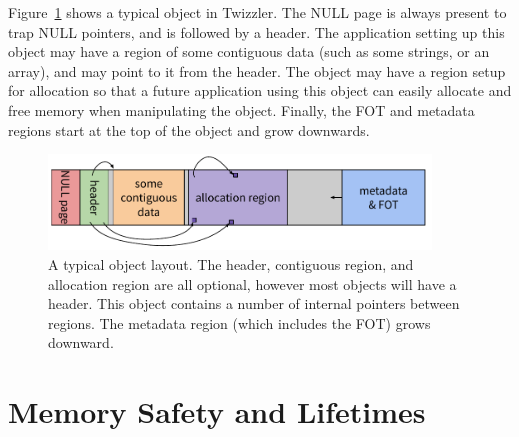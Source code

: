 {    Figure~\ref{fig:typobj} shows a typical object in Twizzler. The NULL page is always present to trap
    NULL pointers, and is followed by a header. The application setting up this object may have a region
    of some contiguous data (such as some strings, or an array), and may point to it from the header.
    The object may have a region setup for allocation so that a future application using this
    object can easily allocate and free memory when manipulating the object. Finally, the FOT and
    metadata regions start at the top of the object and grow downwards.
    \begin{figure}
        \centering
        \includegraphics[width=4in]{fig/typobj}
        \caption{A typical object layout. The header, contiguous region, and allocation region are all
            optional, however most objects will have a header. This object contains a number of internal
            pointers between regions. The metadata region (which includes the FOT) grows downward.}
        \label{fig:typobj}
    \end{figure}
}

\section{Memory Safety and Lifetimes}


